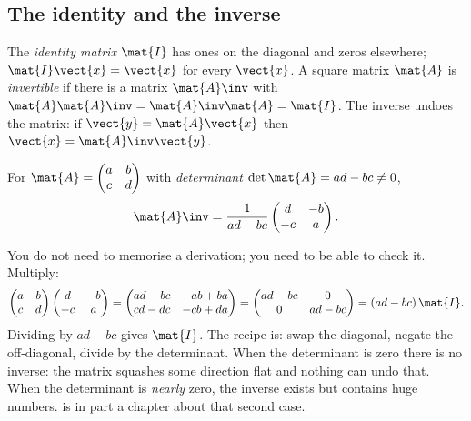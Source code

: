 \subsection{The identity and the inverse}

The \emph{identity matrix} $\mat{I}$ has ones on the diagonal and zeros
elsewhere; $\mat{I}\vect{x} = \vect{x}$ for every $\vect{x}$. A square matrix $\mat{A}$ is
\emph{invertible} if there is a matrix $\mat{A}\inv$ with $\mat{A}\mat{A}\inv = \mat{A}\inv\mat{A}
= \mat{I}$. The inverse undoes the matrix: if $\vect{y} = \mat{A}\vect{x}$ then
$\vect{x} = \mat{A}\inv\vect{y}$.

\begin{definition}
For $\mat{A} = \begin{pmatrix} a & b \\ c & d \end{pmatrix}$ with \emph{determinant}
$\det\mat{A} = ad - bc \neq 0$,
\begin{equation}\label{eq:linalg:inv2}
\mat{A}\inv = \frac{1}{ad - bc}\begin{pmatrix} d & -b \\ -c & a \end{pmatrix}.
\end{equation}
\end{definition}

You do not need to memorise a derivation; you need to be able to check it. Multiply:
\[
\begin{pmatrix} a & b \\ c & d \end{pmatrix}\begin{pmatrix} d & -b \\ -c & a \end{pmatrix}
= \begin{pmatrix} ad - bc & -ab + ba \\ cd - dc & -cb + da \end{pmatrix}
= \begin{pmatrix} ad - bc & 0 \\ 0 & ad - bc \end{pmatrix}
= (ad - bc)\,\mat{I}.
\]
Dividing by $ad - bc$ gives $\mat{I}$. The recipe is: swap the diagonal, negate the
off-diagonal, divide by the determinant. When the determinant is zero there is no inverse: the
matrix squashes some direction flat and nothing can undo that. When the determinant is
\emph{nearly} zero, the inverse exists but contains huge numbers.  is in part a
chapter about that second case.

